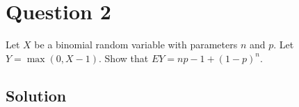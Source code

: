 \section*{Question 2}

Let \( X \) be a binomial random variable with parameters \( n \) and \( p \).
Let \( Y=\max (0, X-1) \).
Show that \( E Y=n p-1+(1-p)^{n} \).

\subsection*{Solution}
